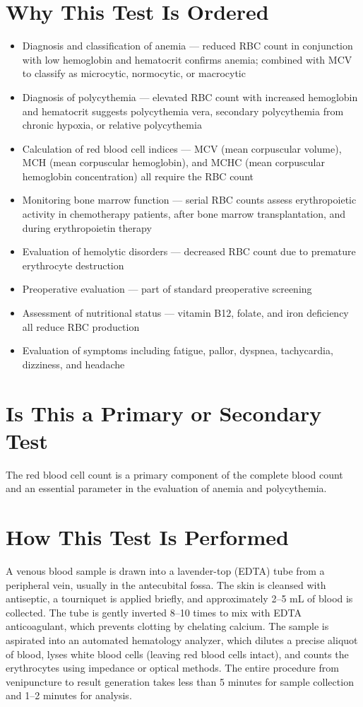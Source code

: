 \section*{Why This Test Is Ordered}
\begin{itemize}
  \item Diagnosis and classification of anemia --- reduced RBC count in conjunction with low hemoglobin and hematocrit confirms anemia; combined with MCV to classify as microcytic, normocytic, or macrocytic
  \item Diagnosis of polycythemia --- elevated RBC count with increased hemoglobin and hematocrit suggests polycythemia vera, secondary polycythemia from chronic hypoxia, or relative polycythemia
  \item Calculation of red blood cell indices --- MCV (mean corpuscular volume), MCH (mean corpuscular hemoglobin), and MCHC (mean corpuscular hemoglobin concentration) all require the RBC count
  \item Monitoring bone marrow function --- serial RBC counts assess erythropoietic activity in chemotherapy patients, after bone marrow transplantation, and during erythropoietin therapy
  \item Evaluation of hemolytic disorders --- decreased RBC count due to premature erythrocyte destruction
  \item Preoperative evaluation --- part of standard preoperative screening
  \item Assessment of nutritional status --- vitamin B12, folate, and iron deficiency all reduce RBC production
  \item Evaluation of symptoms including fatigue, pallor, dyspnea, tachycardia, dizziness, and headache
\end{itemize}

\section*{Is This a Primary or Secondary Test}
The red blood cell count is a primary component of the complete blood count and an essential parameter in the evaluation of anemia and polycythemia.

\section*{How This Test Is Performed}
A venous blood sample is drawn into a lavender-top (EDTA) tube from a peripheral vein, usually in the antecubital fossa. The skin is cleansed with antiseptic, a tourniquet is applied briefly, and approximately 2--5 mL of blood is collected. The tube is gently inverted 8--10 times to mix with EDTA anticoagulant, which prevents clotting by chelating calcium. The sample is aspirated into an automated hematology analyzer, which dilutes a precise aliquot of blood, lyses white blood cells (leaving red blood cells intact), and counts the erythrocytes using impedance or optical methods. The entire procedure from venipuncture to result generation takes less than 5 minutes for sample collection and 1--2 minutes for analysis.

